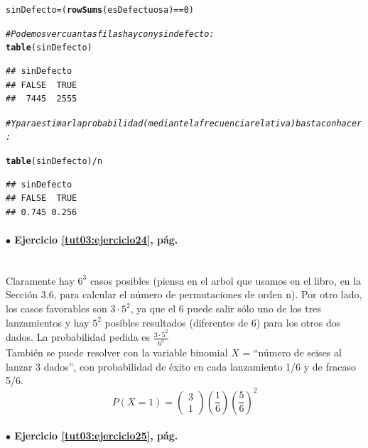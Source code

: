 \documentclass[10pt,a4paper]{article}\usepackage[]{graphicx}\usepackage[]{color}
\makeatletter
\newcommand{\hlnum}[1]{\textcolor[rgb]{0.686,0.059,0.569}{#1}}%
\newcommand{\hlcom}[1]{\textcolor[rgb]{0.678,0.584,0.686}{\textit{#1}}}%
\newcommand{\hlopt}[1]{\textcolor[rgb]{0,0,0}{#1}}%
\newcommand{\hlstd}[1]{\textcolor[rgb]{0.345,0.345,0.345}{#1}}%
\newcommand{\hlkwb}[1]{\textcolor[rgb]{0.69,0.353,0.396}{#1}}%
\newcommand{\hlkwd}[1]{\textcolor[rgb]{0.737,0.353,0.396}{\textbf{#1}}}%
\newenvironment{kframe}{%
 \def\at@end@of@kframe{}%
 \ifinner\ifhmode%
  \def\at@end@of@kframe{\end{minipage}}%
  \begin{minipage}{\columnwidth}%
 \fi\fi%
 \def\FrameCommand##1{\hskip\@totalleftmargin \hskip-\fboxsep
 \colorbox{shadecolor}{##1}\hskip-\fboxsep
     \hskip-\linewidth \hskip-\@totalleftmargin \hskip\columnwidth}%
 \MakeFramed {\advance\hsize-\width
   \@totalleftmargin\z@ \linewidth\hsize
   \@setminipage}}%
 {\par\unskip\endMakeFramed%
 \at@end@of@kframe}
\newenvironment{knitrout}{}{} %
\makeatother
\begin{document}
\begin{knitrout}
\begin{kframe}
\begin{alltt}
\hlstd{sinDefecto} \hlkwb{=} \hlstd{(}\hlkwd{rowSums}\hlstd{(esDefectuosa)} \hlopt{==} \hlnum{0}\hlstd{)}

\hlcom{# Podemos ver cuantas filas hay con y sin defecto:}
\hlkwd{table}\hlstd{(sinDefecto)}
\end{alltt}
\begin{verbatim}
## sinDefecto
## FALSE  TRUE 
##  7445  2555
\end{verbatim}
\begin{alltt}
\hlcom{# Y para estimar la probabilidad (mediante la frecuencia relativa) basta con hacer:}

\hlkwd{table}\hlstd{(sinDefecto)} \hlopt{/} \hlstd{n}
\end{alltt}
\begin{verbatim}
## sinDefecto
## FALSE  TRUE 
## 0.745 0.256
\end{verbatim}
\end{kframe}
\end{knitrout}


\paragraph{\bf $\bullet$ Ejercicio \ref{tut03:ejercicio24}, pág. \pageref{tut03:ejercicio24}}
\label{tut03:ejercicio24:sol}\quad\\

Claramente hay $6^3$ casos posibles (piensa en el arbol que usamos en el libro, en la Sección 3.6,  para calcular el número de permutaciones de orden n). 
Por otro lado, los casos favorables son $3·5^2$, 
ya que el 6 puede salir sólo uno de los tres lanzamientos y  hay $5^2$ posibles resultados (diferentes de 6) para los otros dos dados. La probabilidad pedida es $\frac{3·5^2}{6^3}$\\

También se puede resolver con la variable binomial $X$ = ``número de seises al lanzar 3 dados'', con probabilidad de éxito en cada lanzamiento 1/6 y de fracaso 5/6.
$$ P(X=1)=\left(\begin{array}{c}
3\\
1
\end{array}
\right) \left(\frac{1}{6}\right)\left(\frac{5}{6}\right)^2$$

\paragraph{\bf $\bullet$ Ejercicio \ref{tut03:ejercicio25}, pág. \pageref{tut03:ejercicio25}}
\label{tut03:ejercicio25:sol}
\end{document}
